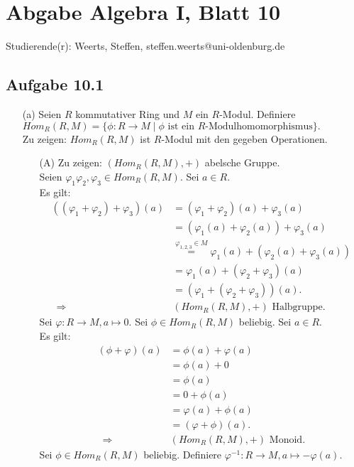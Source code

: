 \documentclass[12pt]{article}
\newcommand{\df}{\enspace\Longrightarrow\enspace}
\newcommand{\homr}{Hom_R(R,M)}
\begin{document}
\section*{Abgabe Algebra I, Blatt 10}

Studierende(r): Weerts, Steffen, steffen.weerts@uni-oldenburg.de

\subsection*{Aufgabe 10.1}
\begin{enumerate}
	\item[(a)] Seien $R$ kommutativer Ring und $M$ ein $R$-Modul. Definiere $\homr=\{\phi:R\rightarrow M\mid\phi\text{ ist ein $R$-Modulhomomorphismus}\}.$ \\
	Zu zeigen: $\homr$ ist $R$-Modul mit den gegeben Operationen.
	\begin{enumerate}
		\item[(A)] Zu zeigen: $(\homr,+)$ abelsche Gruppe. \\
		Seien $\varphi_1\varphi_2,\varphi_3\in\homr$. Sei $a\in R$. \\
		Es gilt:
		\begin{align*}
			((\varphi_1+\varphi_2)+\varphi_3)(a)&=(\varphi_1+\varphi_2)(a)+\varphi_3(a) \\
			&=(\varphi_1(a)+\varphi_2(a))+\varphi_3(a) \\
			&\overset{\varphi_{1,2,3}\in M}{=}\varphi_1(a)+(\varphi_2(a)+\varphi_3(a)) \\
			&=\varphi_1(a)+(\varphi_2+\varphi_3)(a) \\
			&=(\varphi_1+(\varphi_2+\varphi_3))(a). \\
			\df&(\homr,+)\text{ Halbgruppe}.
		\end{align*}
		Sei $\varphi:R\rightarrow M,a\mapsto 0.$ Sei $\phi\in\homr$ beliebig. Sei $a\in R$. \\
		Es gilt:
		\begin{align*}
			(\phi+\varphi)(a)&=\phi(a)+\varphi(a) \\
			&=\phi(a)+0 \\
			&=\phi(a) \\
			&=0+\phi(a) \\
			&=\varphi(a)+\phi(a) \\
			&=(\varphi+\phi)(a). \\
			\df&(\homr,+)\text{ Monoid}.
		\end{align*}
		Sei $\phi\in\homr$ beliebig. Definiere $\varphi^{-1}:R\rightarrow M,a\mapsto-\varphi(a).$ \\

\end{enumerate}
\end{enumerate}
\end{document}
